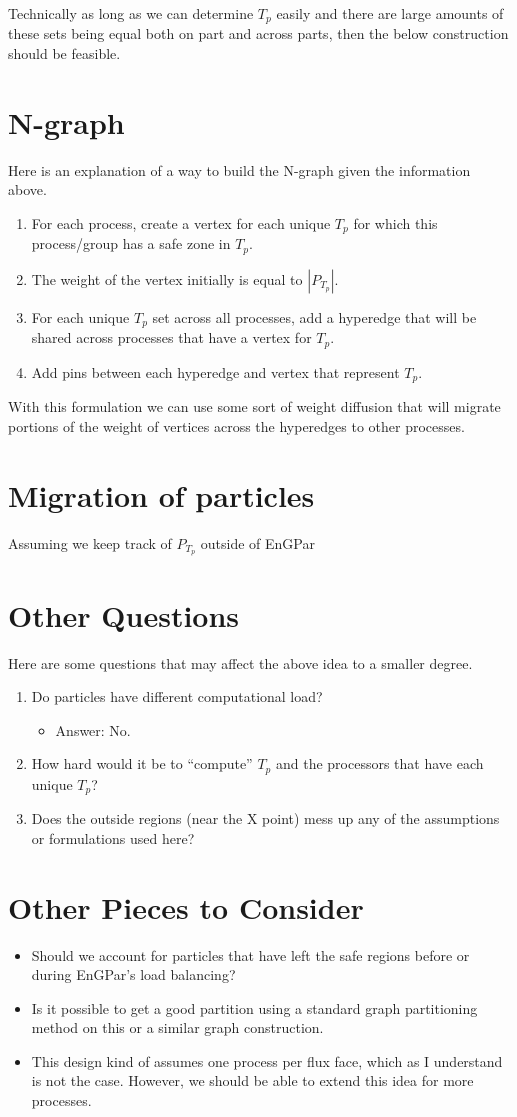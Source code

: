 \documentclass[a4paper]{article}
\begin{document}
Technically as long as we can determine $T_p$ easily and there are large amounts of these sets being equal both on part and across parts, then the below construction should be feasible.

\section{N-graph}
Here is an explanation of a way to build the N-graph given the information above.
\begin{enumerate}
\item For each process, create a vertex for each unique $T_p$ for which this process/group has a safe zone in $T_p$.
\item The weight of the vertex initially is equal to {\color{blue} $|P_{T_p}|$.}
\item For each unique $T_p$ set across all processes, add a hyperedge that will be shared across processes that have a vertex for $T_p$.
\item Add pins between each hyperedge and vertex that represent $T_p$.
\end{enumerate}
With this formulation we can use some sort of weight diffusion that will migrate portions of the weight of vertices across the hyperedges to other processes. 
{
  \color{blue}
\section{Migration of particles}
Assuming we keep track of $P_{T_p}$ outside of EnGPar
}
\section{Other Questions}
Here are some questions that may affect the above idea to a smaller degree.
\begin{enumerate}
\item Do particles have different computational load?
  \begin{itemize}
  \item Answer: No.
  \end{itemize}
\item How hard would it be to ``compute'' $T_p$ and the processors that have each unique $T_p$?
\item Does the outside regions (near the X point) mess up any of the assumptions or formulations used here?
\end{enumerate}

\section{Other Pieces to Consider}
\begin{itemize}
\item Should we account for particles that have left the safe regions before or during EnGPar's load balancing?
\item Is it possible to get a good partition using a standard graph partitioning method on this or a similar graph construction.
  \item This design kind of assumes one process per flux face, which as I understand is not the case. However, we should be able to extend this idea for more processes.
\end{itemize}
\end{document}
